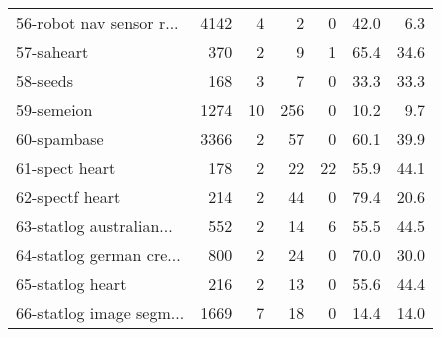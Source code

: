 \begin{table}[h]
\begin{center}
\begin{tabular}{l|r r r r r r}
56-robot nav sensor r... & 4142 & 4 & 2 & 0 &  42.0 &   6.3\\
57-saheart & 370 & 2 & 9 & 1 &  65.4 &  34.6\\\hline
58-seeds & 168 & 3 & 7 & 0 &  33.3 &  33.3\\
59-semeion & 1274 & 10 & 256 & 0 &  10.2 &   9.7\\
60-spambase & 3366 & 2 & 57 & 0 &  60.1 &  39.9\\\hline
61-spect heart & 178 & 2 & 22 & 22 &  55.9 &  44.1\\
62-spectf heart & 214 & 2 & 44 & 0 &  79.4 &  20.6\\
63-statlog australian... & 552 & 2 & 14 & 6 &  55.5 &  44.5\\\hline
64-statlog german cre... & 800 & 2 & 24 & 0 &  70.0 &  30.0\\
65-statlog heart & 216 & 2 & 13 & 0 &  55.6 &  44.4\\
66-statlog image segm... & 1669 & 7 & 18 & 0 &  14.4 &  14.0\\\hline\end{tabular}
\label{tab:datasetsb}
\end{center}
\end{table}
